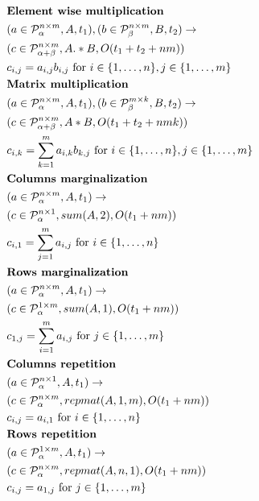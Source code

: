 \documentclass{article}
\begin{document}
\begin{align*}
&\text{{\bf Element wise multiplication}}\\
&(a \in \mathcal{P}^{n \times m}_\alpha, A, t_1), (b \in \mathcal{P}^{n \times m}_\beta, B, t_2) \rightarrow \\ 
&(c \in \mathcal{P}^{n \times m}_{\alpha + \beta}, A .* B, O(t_1 + t_2 + nm)) \\
&c_{i,j} = a_{i,j}b_{i, j} \text{ for } i \in \{1, \dots, n\}, j \in \{1, \dots, m\} \\
&\text{{\bf Matrix multiplication}}\\
&(a \in \mathcal{P}^{n \times m}_\alpha, A, t_1), (b \in \mathcal{P}^{m \times k}_\beta, B, t_2) \rightarrow \\ 
&(c \in \mathcal{P}^{n \times m}_{\alpha + \beta}, A * B, O(t_1 + t_2 + nmk)) \\
&c_{i,k} = \sum_{k = 1}^m a_{i,k}b_{k, j} \text{ for } i \in \{1, \dots, n\}, j \in \{1, \dots, m\} \\
&\text{{\bf Columns marginalization}}\\
&(a \in \mathcal{P}^{n \times m}_\alpha, A, t_1) \rightarrow \\ 
&(c \in \mathcal{P}^{n \times 1}_\alpha, sum(A, 2), O(t_1 + nm)) \\
&c_{i, 1} = \sum_{j = 1}^m a_{i, j} \text{ for } i \in \{1, \dots, n\}\\
&\text{{\bf Rows marginalization}}\\
&(a \in \mathcal{P}^{n \times m}_\alpha, A, t_1) \rightarrow \\ 
&(c \in \mathcal{P}^{1 \times m}_\alpha, sum(A, 1), O(t_1 + nm)) \\
&c_{1, j} = \sum_{i = 1}^m a_{i, j} \text{ for } j \in \{1, \dots, m\}\\
&\text{{\bf Columns repetition}}\\
&(a \in \mathcal{P}^{n \times 1}_\alpha, A, t_1) \rightarrow \\ 
&(c \in \mathcal{P}^{n \times m}_\alpha, repmat(A, 1, m), O(t_1 + nm)) \\
&c_{i, j} = a_{i, 1} \text{ for } i \in \{1, \dots, n\}\\
&\text{{\bf Rows repetition}}\\
&(a \in \mathcal{P}^{1 \times m}_\alpha, A, t_1) \rightarrow \\ 
&(c \in \mathcal{P}^{n \times m}_\alpha, repmat(A, n, 1), O(t_1 + nm)) \\
&c_{i, j} = a_{1, j} \text{ for } j \in \{1, \dots, m\}\\

\end{align*}
\end{document}
